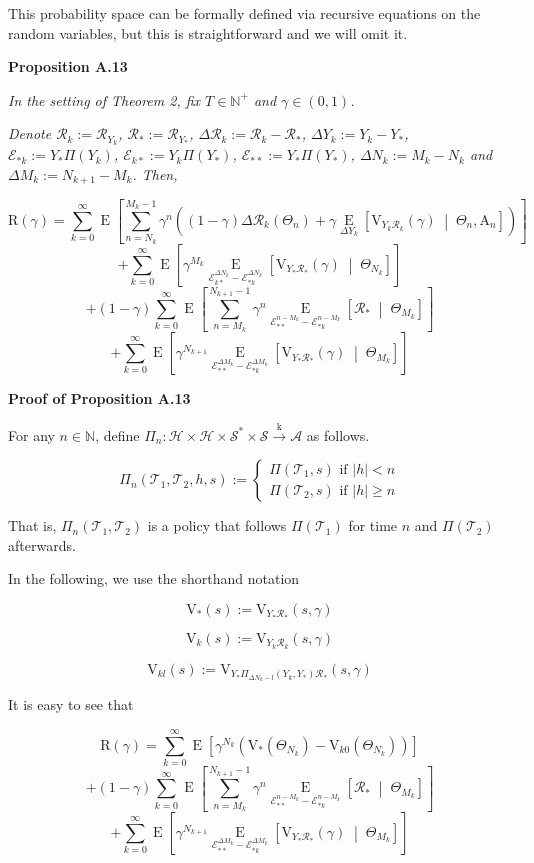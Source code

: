 \documentclass[a4paper]{article}
\newcommand{\Co}[1]{}
\newcommand{\AP}[1]{\left(#1\right)}
\newcommand{\AB}[1]{\left[#1\right]}
\newcommand{\ABM}[2]{\left[#1\;\middle\vert\;#2\right]}
\newcommand{\Abs}[1]{\left\vert #1 \right\vert}
\newcommand{\E}[1]{\operatorname{E}\AB{#1}}
\newcommand{\CE}[3]{\underset{#1}{\operatorname{E}}\ABM{#2}{#3}}
\newcommand{\Nats}{\mathbb{N}}
\newcommand{\K}{\xrightarrow{\mathrm{k}}}
\newcommand{\St}{\mathcal{S}}
\newcommand{\A}{\mathcal{A}}
\newcommand{\R}{\mathcal{R}}
\newcommand{\T}{\mathcal{T}}
\newcommand{\Hy}{\mathcal{H}}
\newcommand{\V}{\mathrm{V}}
\newcommand{\Reg}{\mathrm{R}}
\newcommand{\THy}{Y_*}
\newcommand{\SHy}{Y}
\newcommand{\AT}{\mathrm{A}}
\newcommand{\Ev}{\mathcal{E}}
\newcommand{\ET}{N}
\newcommand{\IT}{M}
\begin{document}
This probability space can be formally defined via recursive equations on the random variables, but this is straightforward and we will omit it.

\textbf{Proposition A.13}\Co{b}

\textit{In the setting of Theorem 2, fix $T\in\Nats^+$ and $\gamma\in(0,1)$.}\Co{i}

\textit{Denote $\R_k:=\R_{\SHy_k}$, $\R_*:=\R_{\THy}$, $\Delta\R_k:=\R_k-\R_*$, $\Delta\SHy_k:=\SHy_k-\THy$, $\Ev_{*k}:=\SHy_*\Pi\AP{\SHy_{k}}$, $\Ev_{k*}:=\SHy_{k}\Pi\AP{\SHy_*}$, $\Ev_{**}:=\THy\Pi\AP{\THy}$, $\Delta\ET_k:=\IT_k-\ET_k$ and $\Delta\IT_k:=\ET_{k+1}-\IT_k$. Then,}\Co{i}

$$\Reg(\gamma)=\sum_{k=0}^\infty\E{\sum_{n=\ET_k}^{\IT_k-1}\gamma^{n}\AP{(1-\gamma)\Delta\R_k\AP{\Theta_n}+\gamma\CE{\Delta\SHy_k}{\V_{\SHy_k\R_k}(\gamma)}{\Theta_n,\AT_n}}}$$
$$+\sum_{k=0}^\infty\E{{\gamma^{\IT_k}}\CE{\Ev_{k*}^{\Delta\ET_k}-\Ev_{*k}^{\Delta\ET_k}}{\V_{\SHy_*\R_*}(\gamma)}{\Theta_{\ET_k}}}$$
$$+(1-\gamma)\sum_{k=0}^\infty\E{\sum_{n=\IT_k}^{\ET_{k+1}-1}\gamma^n\CE{\Ev_{**}^{n-\IT_k}-\Ev_{*k}^{n-\IT_k}}{\R_*}{\Theta_{\IT_k}}}$$
$$+\sum_{k=0}^\infty\E{\gamma^{\ET_{k+1}}\CE{\Ev_{**}^{\Delta\IT_k}-\Ev_{*k}^{\Delta\IT_k}}{\V_{\THy\R_*}(\gamma)}{\Theta_{\IT_k}}}$$

\textbf{Proof of Proposition A.13}\Co{b}

For any $n\in\Nats$, define $\Pi_n:\Hy\times\Hy\times\St^*\times\St\K\A$ as follows.

$$\Pi_n\AP{\T_1,\T_2,h,s}:=\begin{cases} \Pi\AP{\T_1,s} \text{ if } \Abs{h}<n \\ \Pi\AP{\T_2,s} \text{ if }\Abs{h} \geq n \end{cases}$$

That is, $\Pi_n\AP{\T_1,\T_2}$ is a policy that follows $\Pi\AP{\T_1}$ for time $n$ and $\Pi\AP{\T_2}$ afterwards. 

In the following, we use the shorthand notation 

$$\V_*(s):=\V_{\SHy_*\R_*}(s,\gamma)$$

$$\V_k(s):=\V_{\SHy_{k}\R_k}(s,\gamma)$$

$$\V_{kl}(s):=\V_{\SHy_{*}\Pi_{\Delta\ET_k-l}\AP{\SHy_{k},\SHy_*}\R_*}\AP{s,\gamma}$$

It is easy to see that

$$\Reg(\gamma)=\sum_{k=0}^\infty{\E{\gamma^{\ET_k}\AP{\V_{*}\AP{\Theta_{\ET_k}}-\V_{k0}\AP{\Theta_{\ET_k}}}}}$$
$$+(1-\gamma)\sum_{k=0}^\infty\E{\sum_{n=\IT_k}^{\ET_{k+1}-1}\gamma^n\CE{\Ev_{**}^{n-\IT_k}-\Ev_{*k}^{n-\IT_k}}{\R_*}{\Theta_{\IT_k}}}$$
$$+\sum_{k=0}^\infty\E{\gamma^{\ET_{k+1}}\CE{\Ev_{**}^{\Delta\IT_k}-\Ev_{*k}^{\Delta\IT_k}}{\V_{\THy\R_*}(\gamma)}{\Theta_{\IT_k}}}$$
\end{document}
